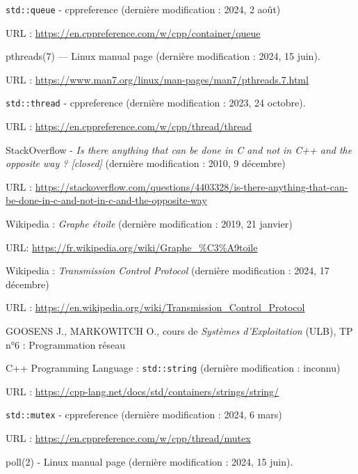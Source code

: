 \documentclass{article}
\begin{document}
\begin{thebibliography}{999}
    \texttt{std::queue} - cppreference (dernière modification : 2024, 2 août)

    URL : \url{https://en.cppreference.com/w/cpp/container/queue}
    
        pthreads(7) — Linux manual page (dernière modification : 2024, 15 juin).

        URL : \url{https://www.man7.org/linux/man-pages/man7/pthreads.7.html}

        \texttt{std::thread} - cppreference (dernière modification : 2023, 24 octobre).

        URL : \url{https://en.cppreference.com/w/cpp/thread/thread}

        StackOverflow - \textit{Is there anything that can be done in C and not in C++ and the opposite way ? [closed]} (dernière modification : 2010, 9 décembre)
        
    URL : \url{https://stackoverflow.com/questions/4403328/is-there-anything-that-can-be-done-in-c-and-not-in-c-and-the-opposite-way}

		Wikipedia : \textit{Graphe étoile} (dernière modification : 2019, 21 janvier)
        
        URL: \url{https://fr.wikipedia.org/wiki/Graphe_%C3%A9toile}

    Wikipedia : \textit{Transmission Control Protocol} (dernière modification : 2024, 17 décembre)

    URL : \url{https://en.wikipedia.org/wiki/Transmission_Control_Protocol}

    GOOSENS J., MARKOWITCH O., cours de \textit{Systèmes d'Exploitation} (ULB), TP n°6 : Programmation réseau

    C++ Programming Language : \texttt{std::string} (dernière modification : inconnu)

    URL : \url{https://cpp-lang.net/docs/std/containers/strings/string/}

    \texttt{std::mutex} - cppreference (dernière modification : 2024, 6 mars)

    URL : \url{https://en.cppreference.com/w/cpp/thread/mutex}

    poll(2) - Linux manual page (dernière modification : 2024, 15 juin).


\end{thebibliography}
\end{document}

